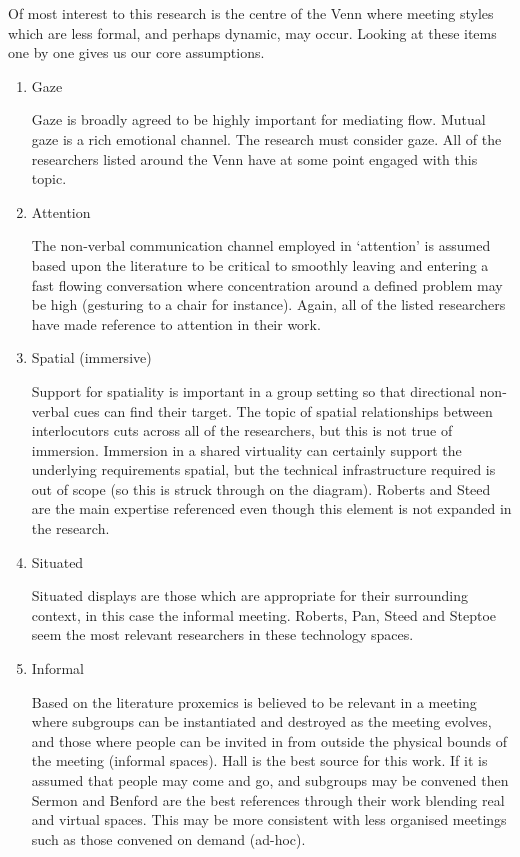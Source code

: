 Of most interest to this research is the centre of the Venn where meeting styles which are less formal, and perhaps dynamic, may occur. Looking at these items one by one gives us our core assumptions.

                \begin{enumerate}
                \item Gaze\par
                 Gaze is broadly agreed to be highly important for mediating flow. Mutual gaze is a rich emotional channel. The research must consider gaze. All of the researchers listed around the Venn have at some point engaged with this topic.
                \item Attention\par
                The non-verbal communication channel employed in `attention' is assumed based upon the literature to be critical to smoothly leaving and entering a fast flowing conversation where concentration around a defined problem may be high (gesturing to a chair for instance). Again, all of the listed researchers have made reference to attention in their work.
                \item Spatial (immersive)\par
Support for spatiality is important in a group setting so that directional non-verbal cues can find their target. The topic of spatial relationships between interlocutors cuts across all of the researchers, but this is not true of immersion. Immersion in a shared virtuality can certainly support the underlying requirements spatial, but the technical infrastructure required is out of scope (so this is struck through on the diagram). Roberts and Steed are the main expertise referenced even though this element is not expanded in the research.
                \item Situated\par
                Situated displays are those which are appropriate for their surrounding context, in this case the informal meeting. Roberts, Pan, Steed and Steptoe seem the most relevant researchers in these technology spaces.
                \item Informal\par
                   Based on the literature proxemics is believed to be relevant in a meeting where subgroups can be instantiated and destroyed as the meeting evolves, and those where people can be invited in from outside the physical bounds of the meeting (informal spaces). Hall is the best source for this work. If it is assumed that people may come and go, and subgroups may be convened then Sermon and Benford are the best references through their work blending real and virtual spaces. This may be more consistent with less organised meetings such as those convened on demand (ad-hoc).
                \end{enumerate}

